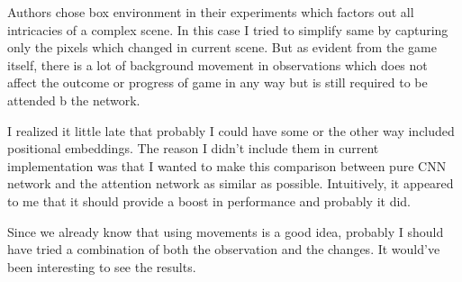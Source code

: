 \documentclass[english]{sobraep}
\begin{document}
Authors chose box environment in their experiments which factors out all intricacies of a complex scene. In this case I tried to simplify same by capturing only the pixels which changed in current scene. But as evident from the game itself, there is a lot of background movement in observations which does not affect the outcome or progress of game in any way but is still required to be attended b the network.

I realized it little late that probably I could have some or the other way included positional embeddings. The reason I didn't include them in current implementation was that I wanted to make this comparison between pure CNN network and the attention network as similar as possible. Intuitively, it appeared to me that it should provide a boost in performance and probably it did.

Since we already know that using movements is a good idea, probably I should have tried a combination of both the observation and the changes. It would've been interesting to see the results.




\end{document}
